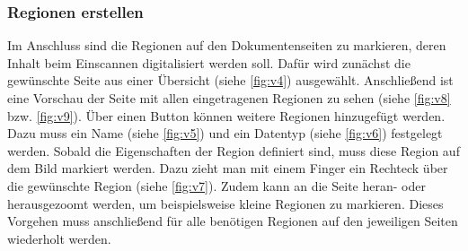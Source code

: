 \documentclass[notables, nomenclature, oneside, 150]{HSMW-Thesis}
\begin{document}
			\subsubsection*{Regionen erstellen}
				Im Anschluss sind die Regionen auf den Dokumentenseiten zu markieren, deren Inhalt beim Einscannen digitalisiert werden soll. Dafür wird zunächst die gewünschte Seite aus einer Übersicht (siehe \ref{fig:v4}) ausgewählt. Anschließend ist eine Vorschau der Seite mit allen eingetragenen Regionen zu sehen (siehe \ref{fig:v8} bzw. \ref{fig:v9}). Über einen Button können weitere Regionen hinzugefügt werden. Dazu muss ein Name (siehe \ref{fig:v5}) und ein Datentyp (siehe \ref{fig:v6}) festgelegt werden. Sobald die Eigenschaften der Region definiert sind, muss diese Region auf dem Bild markiert werden. Dazu zieht man mit einem Finger ein Rechteck über die gewünschte Region (siehe \ref{fig:v7}). Zudem kann an die Seite heran- oder herausgezoomt werden, um beispielsweise kleine Regionen zu markieren. Dieses Vorgehen muss anschließend für alle benötigen Regionen auf den jeweiligen Seiten wiederholt werden.
 
\end{document}
